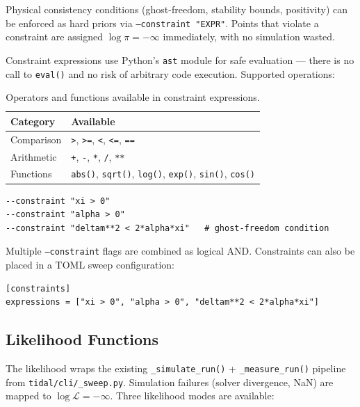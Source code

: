 Physical consistency conditions (ghost-freedom, stability bounds, positivity)
can be enforced as hard priors via \texttt{--constraint "EXPR"}.  Points that
violate a constraint are assigned $\log\pi = -\infty$ immediately, with no
simulation wasted.

Constraint expressions use Python's \texttt{ast} module for safe evaluation ---
there is no call to \texttt{eval()} and no risk of arbitrary code execution.
Supported operations:

\begin{table}[htbp]
\centering
\caption{Operators and functions available in constraint expressions.}
\label{tab:constraint-ops}
\begin{tabular}{@{}ll@{}}
\toprule
Category & Available \\
\midrule
Comparison & \texttt{>}, \texttt{>=}, \texttt{<}, \texttt{<=}, \texttt{==} \\
Arithmetic & \texttt{+}, \texttt{-}, \texttt{*}, \texttt{/}, \texttt{**} \\
Functions  & \texttt{abs()}, \texttt{sqrt()}, \texttt{log()}, \texttt{exp()}, \texttt{sin()}, \texttt{cos()} \\
\bottomrule
\end{tabular}
\end{table}

\begin{lstlisting}[style=bash]
--constraint "xi > 0"
--constraint "alpha > 0"
--constraint "deltam**2 < 2*alpha*xi"   # ghost-freedom condition
\end{lstlisting}

Multiple \texttt{--constraint} flags are combined as logical AND.
Constraints can also be placed in a TOML sweep configuration:

\begin{lstlisting}[style=toml]
[constraints]
expressions = ["xi > 0", "alpha > 0", "deltam**2 < 2*alpha*xi"]
\end{lstlisting}

\subsection{Likelihood Functions}
\label{sec:inference-likelihood}

The likelihood wraps the existing \texttt{\_simulate\_run()} +
\texttt{\_measure\_run()} pipeline from \texttt{tidal/cli/\_sweep.py}.
Simulation failures (solver divergence, NaN) are mapped to
$\log\mathcal{L} = -\infty$.  Three likelihood modes are available:

